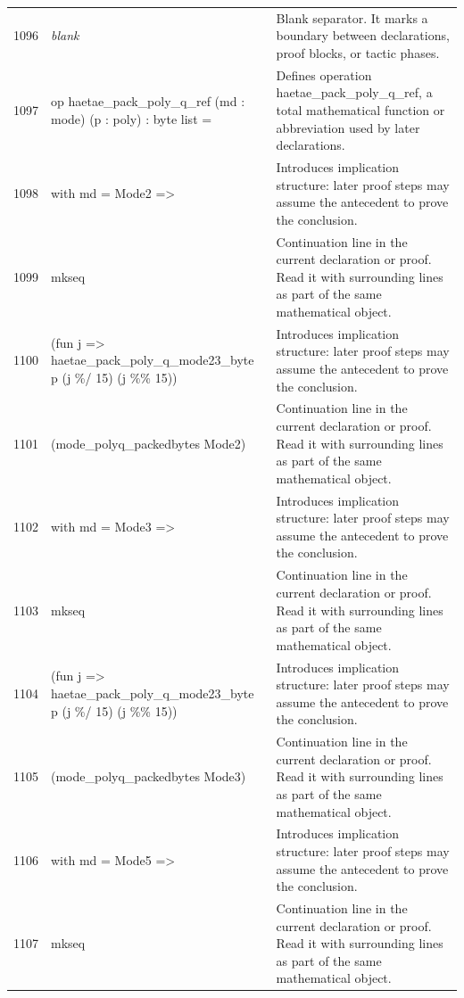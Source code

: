 \documentclass[10pt]{article}
\begin{document}
\begin{longtable}{r L{0.53\textwidth} L{0.37\textwidth}}
1096 & {\ttfamily\scriptsize \emph{blank}} & Blank separator.  It marks a boundary between declarations, proof blocks, or tactic phases. \\
1097 & {\ttfamily\scriptsize op haetae\_pack\_poly\_q\_ref (md : mode) (p : poly) : byte list =} & Defines operation haetae\_pack\_poly\_q\_ref, a total mathematical function or abbreviation used by later declarations. \\
1098 & {\ttfamily\scriptsize   with md = Mode2 =>} & Introduces implication structure: later proof steps may assume the antecedent to prove the conclusion. \\
1099 & {\ttfamily\scriptsize     mkseq} & Continuation line in the current declaration or proof.  Read it with surrounding lines as part of the same mathematical object. \\
1100 & {\ttfamily\scriptsize       (fun j => haetae\_pack\_poly\_q\_mode23\_byte p (j \%/ 15) (j \%\% 15))} & Introduces implication structure: later proof steps may assume the antecedent to prove the conclusion. \\
1101 & {\ttfamily\scriptsize       (mode\_polyq\_packedbytes Mode2)} & Continuation line in the current declaration or proof.  Read it with surrounding lines as part of the same mathematical object. \\
1102 & {\ttfamily\scriptsize   with md = Mode3 =>} & Introduces implication structure: later proof steps may assume the antecedent to prove the conclusion. \\
1103 & {\ttfamily\scriptsize     mkseq} & Continuation line in the current declaration or proof.  Read it with surrounding lines as part of the same mathematical object. \\
1104 & {\ttfamily\scriptsize       (fun j => haetae\_pack\_poly\_q\_mode23\_byte p (j \%/ 15) (j \%\% 15))} & Introduces implication structure: later proof steps may assume the antecedent to prove the conclusion. \\
1105 & {\ttfamily\scriptsize       (mode\_polyq\_packedbytes Mode3)} & Continuation line in the current declaration or proof.  Read it with surrounding lines as part of the same mathematical object. \\
1106 & {\ttfamily\scriptsize   with md = Mode5 =>} & Introduces implication structure: later proof steps may assume the antecedent to prove the conclusion. \\
1107 & {\ttfamily\scriptsize     mkseq} & Continuation line in the current declaration or proof.  Read it with surrounding lines as part of the same mathematical object. \\

\end{longtable}
\end{document}

